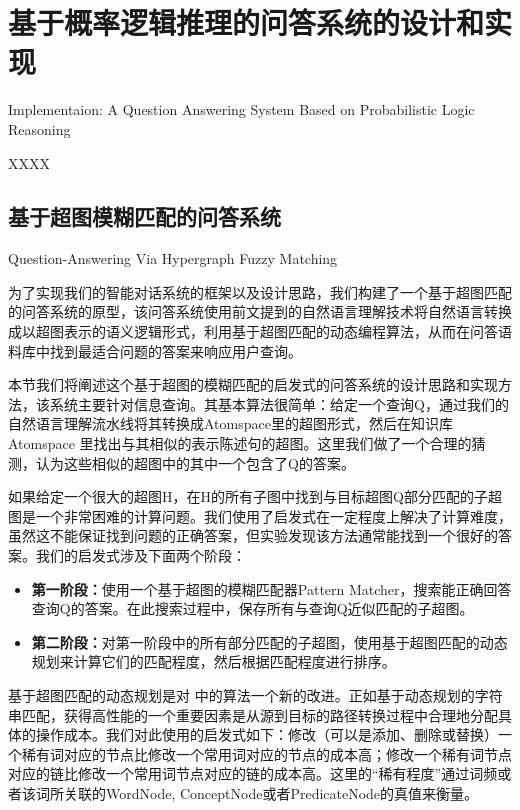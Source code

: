 \chapter{基于概率逻辑推理的问答系统的设计和实现}{Implementaion: A Question Answering System Based on Probabilistic Logic Reasoning}
\label{chap:dialogue}

XXXX




\section{基于超图模糊匹配的问答系统}{Question-Answering Via Hypergraph Fuzzy Matching}

为了实现我们的智能对话系统的框架以及设计思路，我们构建了一个基于超图匹配的问答系统的原型，该问答系统使用前文提到的自然语言理解技术将自然语言转换成以超图表示的语义逻辑形式，利用基于超图匹配的动态编程算法，从而在问答语料库中找到最适合问题的答案来响应用户查询。

本节我们将阐述这个基于超图的模糊匹配的启发式的问答系统的设计思路和实现方法，该系统主要针对信息查询。其基本算法很简单：给定一个查询Q，通过我们的自然语言理解流水线将其转换成Atomspace里的超图形式，然后在知识库Atomspace 里找出与其相似的表示陈述句的超图。这里我们做了一个合理的猜测，认为这些相似的超图中的其中一个包含了Q的答案。

如果给定一个很大的超图H，在H的所有子图中找到与目标超图Q部分匹配的子超图是一个非常困难的计算问题。我们使用了启发式在一定程度上解决了计算难度，虽然这不能保证找到问题的正确答案，但实验发现该方法通常能找到一个很好的答案。我们的启发式涉及下面两个阶段：

\begin{itemize}
\item {\bf 第一阶段：}使用一个基于超图的模糊匹配器Pattern Matcher，搜索能正确回答查询Q的答案。在此搜索过程中，保存所有与查询Q近似匹配的子超图。
\item {\bf 第二阶段：}对第一阶段中的所有部分匹配的子超图，使用基于超图匹配的动态规划来计算它们的匹配程度，然后根据匹配程度进行排序。
\end{itemize}
基于超图匹配的动态规划是对 \cite{Zass2008}中的算法一个新的改进。正如基于动态规划的字符串匹配，获得高性能的一个重要因素是从源到目标的路径转换过程中合理地分配具体的操作成本。我们对此使用的启发式如下：修改（可以是添加、删除或替换）一个稀有词对应的节点比修改一个常用词对应的节点的成本高；修改一个稀有词节点对应的链比修改一个常用词节点对应的链的成本高。这里的“稀有程度”通过词频或者该词所关联的WordNode, ConceptNode或者PredicateNode的真值来衡量。

